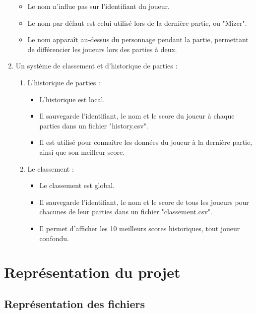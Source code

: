\documentclass{article}
\begin{document}
\begin{enumerate}
\begin{itemize}
        \item Le nom n'influe pas sur l'identifiant du joueur.
        \item Le nom par défaut est celui utilisé lors de la dernière partie, ou "Mizer".
        \item Le nom apparaît au-dessus du personnage pendant la partie, permettant de différencier les joueurs lors des parties à deux.
    \end{itemize}
    \item Un système de classement et d'historique de parties :
    \begin{enumerate}
        \item L'historique de parties :
        \begin{itemize}
            \item L'historique est local.
            \item Il sauvegarde l'identifiant, le nom et le score du joueur à chaque parties dans un fichier "history.csv".
            \item Il est utilisé pour connaître les données du joueur à la dernière partie, ainsi que son meilleur score.
        \end{itemize}
        \item Le classement :
        \begin{itemize}
            \item Le classement est global.
            \item Il sauvegarde l'identifiant, le nom et le score de tous les joueurs pour chacunes de leur parties dans un fichier "classement.csv".
            \item Il permet d'afficher les 10 meilleurs scores historiques, tout joueur confondu.
        \end{itemize}
    \end{enumerate}
\end{enumerate}


\section{Représentation du projet}
\subsection{Représentation des fichiers}
\end{document}
